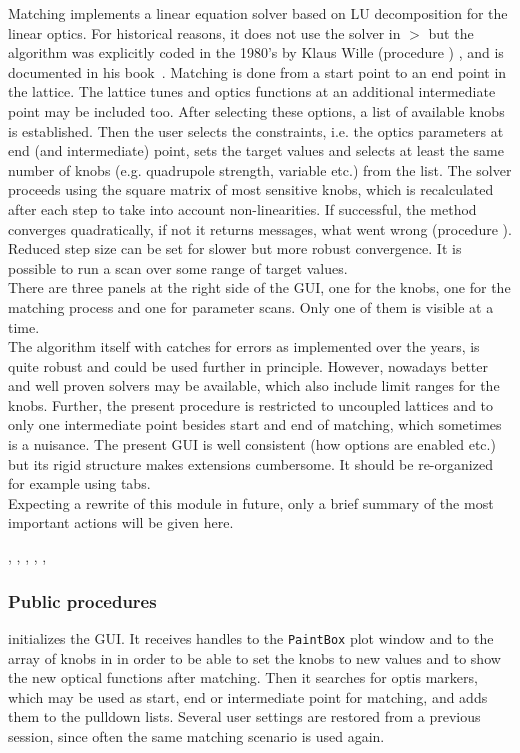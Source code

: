 \documentclass[12pt]{article}
\newcommand\code[1]{{\tt #1}}
\newcommand\guico[1]{{\color{blue}\code{#1}}}
\newcommand{\unico}[1]{{\color{burntorange}\code{#1}}}
\newcommand{\prcod}[2]{\opauni{#1}$>$\unico{#2}}
\newcommand{\opagui}[1]{\colorbox{blue!20}{{\color{black}\code{#1}}}}
\newcommand{\ogui}[1]{\hyperref[#1]{\opagui{#1}}}
\newcommand{\opaguif}[1]{\colorbox{violet!30}{{\color{black}\code{#1}}}}
\newcommand{\oguif}[1]{\hyperref[#1]{\opaguif{#1}}}
\newcommand{\opauni}[1]{\colorbox{orange!30}{{\color{black}\code{#1}}}}
\newcommand{\ouni}[1]{\hyperref[#1]{\opauni{#1}}}
\newcommand{\uses}[1]{\flushleft {\bf Uses:} #1}
\newcommand{\desc}[1]{#1}
\newcommand{\ppro}[1]{\subsubsection*{Public procedures} #1}
\newcommand{\todo}[1]{{\color{red} #1}}
\begin{document}
\desc{Matching implements a linear equation solver based on LU decomposition for the linear optics. For historical reasons, it does not use the solver in \prcod{mathlib}{LUDCMP,LUBKSB} but the algorithm was explicitly coded in the 1980's by Klaus Wille (procedure \guico{Step}) , and is documented in his book~\cite{kwille}. Matching is done from a start point to an end point in the lattice. The lattice tunes and optics functions at an additional intermediate point may be included too.  After selecting these options, a list of available knobs is established. Then the user selects the constraints, i.e. the optics parameters at end (and intermediate) point, sets the target values and selects at least the same number of knobs (e.g. quadrupole strength, variable etc.) from the list. The solver proceeds using the square matrix of most sensitive knobs, which is recalculated after each step to take into account non-linearities. If successful, the method converges quadratically, if not it returns messages, what went wrong (procedure \guico{Term}). Reduced step size can be set for slower but more robust convergence. It is possible to run a scan over some range of target values. \\
There are three panels at the right side of the GUI, one for the knobs, one for the matching process and one for parameter scans. Only one of them is visible at a time.\\
\todo{The algorithm itself with catches for errors as implemented over the years, is quite robust and could be used further in principle. However, nowadays better and well proven solvers may be available, which also include limit ranges for the knobs. Further, the present procedure is restricted to uncoupled lattices and to only one intermediate point besides start and end of matching, which sometimes is a nuisance. The present GUI is well consistent (how options are enabled etc.) but its rigid structure makes extensions cumbersome. It should be re-organized for example using tabs.}\\
Expecting a rewrite of this module in future, only a brief summary of the most important actions will be given here.}

\uses{\ouni{linoplib}, \oguif{knobframe}, \ogui{omatchscan}, \ouni{globlib},  \oguif{comfigureframe}, \ouni{comauxlib}} 

\ppro{
\guico{Load} initializes the GUI. It receives handles to the \code{PaintBox} plot window and to the array of \oguif{knobframe} knobs in \ogui{opalinop} in order to be able to set the knobs to new values and to show the new optical functions after matching. Then it searches for optis markers, which may be used as start, end or intermediate point for matching, and adds them to the \guico{ini/mat/midpoint} pulldown lists. Several user settings are restored from a previous session, since often the same matching scenario is used again.
}
\end{document}
